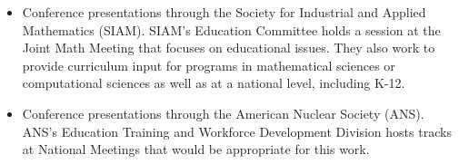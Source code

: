 \documentclass[11pt]{article}
\begin{document}
\begin{itemize}
%
\item Conference presentations through the Society for Industrial and Applied Mathematics (SIAM). SIAM's Education Committee holds a session at the Joint Math Meeting that focuses on educational issues. They also work to provide curriculum input for programs in mathematical sciences or computational sciences as well as at a national level, including K-12.
%
\item Conference presentations through the American Nuclear Society (ANS). ANS's Education Training and Workforce Development Division hosts tracks at National Meetings that would be appropriate for this work. 
\end{itemize}
\end{document}
